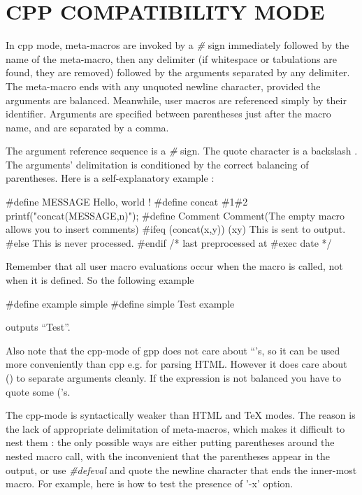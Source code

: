 \htmlHR

\section{CPP COMPATIBILITY MODE}

In cpp mode, meta-macros are invoked by a {\it \#} sign immediately followed
by the name of the meta-macro, then any delimiter (if whitespace or
tabulations are found, they are removed) followed by the arguments separated
by any delimiter. The meta-macro ends with any unquoted newline character,
provided the arguments are balanced. Meanwhile, user macros are referenced
simply by their identifier. Arguments are specified between parentheses just
after the macro name, and are separated by a comma. 

The argument reference sequence is a {\it \#} sign. The quote character is a
backslash {\it {\htmlBackslash}}. The arguments' delimitation is conditioned
by the correct balancing of parentheses. Here is a self-explanatory example : 

\begin{PRE}
   \#define MESSAGE Hello, world !
   \#define concat \#1\#2
   printf("concat(MESSAGE,{\htmlBackslash}{\htmlBackslash}n)");
   \#define Comment
   Comment(The empty macro allows you to insert comments)
   \#ifeq (concat(x,y)) (xy)
   This is sent to output. 
   \#else
   This is never processed.
   \#endif
   /* last preprocessed at \#exec date
    */
\end{PRE}

Remember that all user macro evaluations occur when the macro is called, not
when it is defined. So the following example 

\begin{PRE}
   \#define example simple
   \#define simple Test
   example
\end{PRE}

outputs ``Test''. 

Also note that the cpp-mode of gpp does not care about ``'s, so it can be used
more conveniently than cpp e.g. for parsing HTML. However it does care about
() to separate arguments cleanly. If the expression is not balanced you have
to quote some {\htmlBackslash}('s. 

The cpp-mode is syntactically weaker than HTML and TeX modes. The reason is
the lack of appropriate delimitation of meta-macros, which makes it difficult
to nest them : the only possible ways are either putting parentheses around
the nested macro call, with the inconvenient that the parentheses appear in
the output, or use {\it \#defeval} and quote the newline character that ends
the inner-most macro. For example, here is how to test the presence of '-x'
option. 

